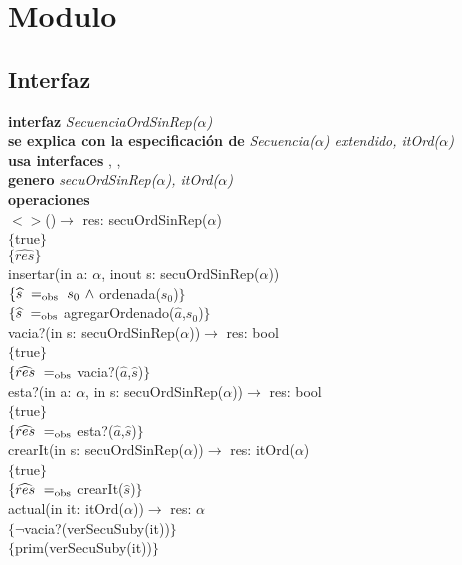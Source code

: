 \section*{Modulo }

\subsection*{Interfaz}
\textbf{interfaz} \textit{SecuenciaOrdSinRep($\alpha$)}\\
\textbf{se explica con la especificaci\'on de} \textit{Secuencia($\alpha$) extendido, itOrd($\alpha$)}\\
\textbf{usa interfaces} , \nombretad{$\alpha$}, \\
\textbf{genero} \textit{secuOrdSinRep($\alpha$), itOrd($\alpha$)}\\
\textbf{operaciones}\\

$<>$()$\longrightarrow$ res: secuOrdSinRep($\alpha$)\\
$\{$true$\}$\\
$\{\widehat{res}\}$\\

insertar(in a: $\alpha$, inout s: secuOrdSinRep($\alpha$))\\
$\{\widehat{s}\ =_{\mathrm{obs}}\ s_0\ \wedge$ ordenada($s_0$)$\}$\\
$\{\widehat{s}\ =_{\mathrm{obs}}$ agregarOrdenado($\widehat{a}$,$s_0$)$\}$\\

vacia?(in s: secuOrdSinRep($\alpha$))$\longrightarrow$ res: bool\\
$\{$true$\}$\\
$\{\widehat{res}\ =_{\mathrm{obs}}$ vacia?($\widehat{a}$,$\widehat{s}$)$\}$\\

esta?(in a: $\alpha$, in s: secuOrdSinRep($\alpha$))$\longrightarrow$ res: bool\\
$\{$true$\}$\\
$\{\widehat{res}\ =_{\mathrm{obs}}$ esta?($\widehat{a}$,$\widehat{s}$)$\}$\\

crearIt(in s: secuOrdSinRep($\alpha$))$\longrightarrow$ res: itOrd($\alpha$)\\
$\{$true$\}$\\
$\{\widehat{res}\ =_{\mathrm{obs}}$ crearIt($\widehat{s}$)$\}$\\

actual(in it: itOrd($\alpha$))$\longrightarrow$ res: $\alpha$\\
$\{\neg$vacia?(verSecuSuby(it))$\}$\\
$\{$prim(verSecuSuby(it))$\}$\\

